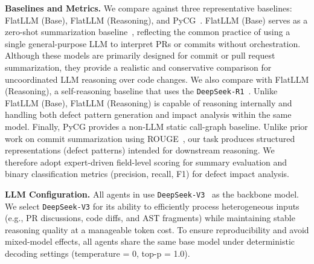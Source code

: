 \noindent \textbf{Baselines and Metrics.} 
We compare \appname against three representative baselines: FlatLLM (Base), FlatLLM (Reasoning), and PyCG~\cite{salis2021pycg}.
FlatLLM (Base) serves as a zero-shot summarization baseline~\cite{liu2019automatic,xiao2024generative}, reflecting the common practice of using a single general-purpose LLM to interpret PRs or commits without orchestration.
Although these models are primarily designed for commit or pull request summarization, they provide a realistic and conservative comparison for uncoordinated LLM reasoning over code changes.
We also compare \appname with FlatLLM (Reasoning), a self-reasoning baseline that uses the \texttt{DeepSeek-R1}~\cite{deepseekr1}. 
Unlike FlatLLM (Base), FlatLLM (Reasoning) is capable of reasoning internally and handling both defect pattern generation and impact analysis within the same model.
Finally, PyCG provides a non-LLM static call-graph baseline.
Unlike prior work on commit summarization using ROUGE~\cite{liu2019automatic,rouge}, our task produces structured representations (defect patterns) intended for downstream reasoning.
We therefore adopt expert-driven field-level scoring for summary evaluation and binary classification metrics (precision, recall, F1) for defect impact analysis.

\noindent \textbf{LLM Configuration.}
All agents in \appname use \texttt{DeepSeek-V3}~\cite{deepseek} as the backbone model.
We select \texttt{DeepSeek-V3} for its ability to efficiently process heterogeneous inputs (e.g., PR discussions, code diffs, and AST fragments) while maintaining stable reasoning quality at a manageable token cost.
To ensure reproducibility and avoid mixed-model effects, all agents share the same base model under deterministic decoding settings (temperature = 0, top-p = 1.0).


